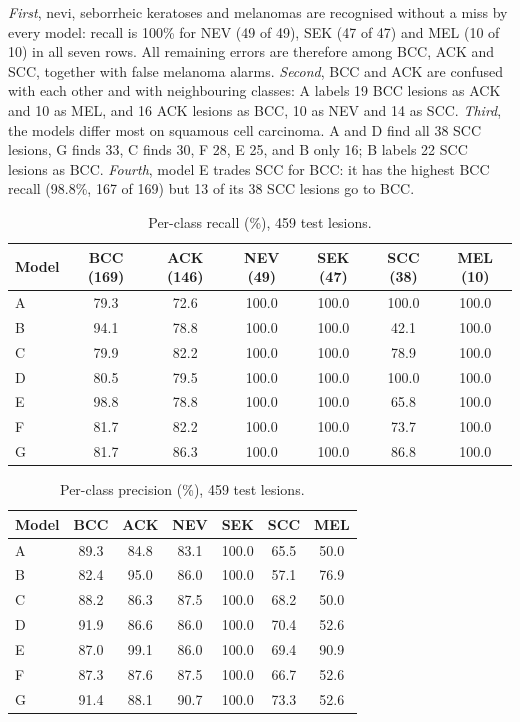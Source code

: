 \documentclass[conference]{IEEEtran}
\begin{document}
\emph{First}, nevi, seborrheic keratoses and melanomas are recognised without a miss by every model: recall is 100\% for NEV (49 of 49), SEK (47 of 47) and MEL (10 of 10) in all seven rows. All remaining errors are therefore among BCC, ACK and SCC, together with false melanoma alarms. \emph{Second}, BCC and ACK are confused with each other and with neighbouring classes: A labels 19 BCC lesions as ACK and 10 as MEL, and 16 ACK lesions as BCC, 10 as NEV and 14 as SCC. \emph{Third}, the models differ most on squamous cell carcinoma. A and D find all 38 SCC lesions, G finds 33, C finds 30, F 28, E 25, and B only 16; B labels 22 SCC lesions as BCC. \emph{Fourth}, model E trades SCC for BCC: it has the highest BCC recall (98.8\%, 167 of 169) but 13 of its 38 SCC lesions go to BCC.

\begin{table}[!t]
\caption{Per-class recall (\%), 459 test lesions.}
\label{tab:recall}
\centering\footnotesize
\begin{tabular}{lcccccc}
\toprule
Model & BCC (169) & ACK (146) & NEV (49) & SEK (47) & SCC (38) & MEL (10) \\
\midrule
A & 79.3 & 72.6 & 100.0 & 100.0 & 100.0 & 100.0 \\
B & 94.1 & 78.8 & 100.0 & 100.0 & 42.1 & 100.0 \\
C & 79.9 & 82.2 & 100.0 & 100.0 & 78.9 & 100.0 \\
D & 80.5 & 79.5 & 100.0 & 100.0 & 100.0 & 100.0 \\
E & 98.8 & 78.8 & 100.0 & 100.0 & 65.8 & 100.0 \\
F & 81.7 & 82.2 & 100.0 & 100.0 & 73.7 & 100.0 \\
G & 81.7 & 86.3 & 100.0 & 100.0 & 86.8 & 100.0 \\
\bottomrule
\end{tabular}
\end{table}


\begin{table}[!t]
\caption{Per-class precision (\%), 459 test lesions.}
\label{tab:prec}
\centering\footnotesize
\begin{tabular}{lcccccc}
\toprule
Model & BCC & ACK & NEV & SEK & SCC & MEL \\
\midrule
A & 89.3 & 84.8 & 83.1 & 100.0 & 65.5 & 50.0 \\
B & 82.4 & 95.0 & 86.0 & 100.0 & 57.1 & 76.9 \\
C & 88.2 & 86.3 & 87.5 & 100.0 & 68.2 & 50.0 \\
D & 91.9 & 86.6 & 86.0 & 100.0 & 70.4 & 52.6 \\
E & 87.0 & 99.1 & 86.0 & 100.0 & 69.4 & 90.9 \\
F & 87.3 & 87.6 & 87.5 & 100.0 & 66.7 & 52.6 \\
G & 91.4 & 88.1 & 90.7 & 100.0 & 73.3 & 52.6 \\
\bottomrule
\end{tabular}
\end{table}
\end{document}
